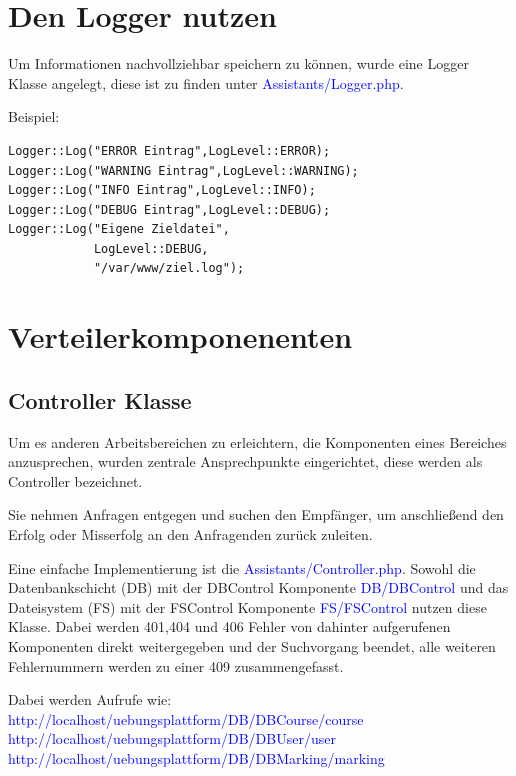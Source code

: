 \documentclass[10pt,a4paper,final,parskip]{scrartcl}
\newcommand{\blau}[1]{\textcolor{blue}{#1}}
\begin{document}
\section{Den Logger nutzen}
Um Informationen nachvollziehbar speichern zu können, wurde eine Logger Klasse angelegt, diese ist zu finden unter \blau{Assistants/Logger.php}.

\begin{minipage}{\textwidth}
Beispiel:
\begin{lstlisting}
Logger::Log("ERROR Eintrag",LogLevel::ERROR);
Logger::Log("WARNING Eintrag",LogLevel::WARNING);
Logger::Log("INFO Eintrag",LogLevel::INFO);
Logger::Log("DEBUG Eintrag",LogLevel::DEBUG);
Logger::Log("Eigene Zieldatei",
            LogLevel::DEBUG, 
            "/var/www/ziel.log");
\end{lstlisting}
\end{minipage}
 
\section{Verteilerkomponenenten}
\subsection{Controller Klasse}
Um es anderen Arbeitsbereichen zu erleichtern, die Komponenten eines Bereiches anzusprechen, wurden zentrale Ansprechpunkte eingerichtet, diese werden als Controller bezeichnet.

Sie nehmen Anfragen entgegen und suchen den Empfänger, um anschließend den Erfolg oder Misserfolg an den Anfragenden zurück zuleiten.

Eine einfache Implementierung ist die \blau{Assistants/Controller.php}. Sowohl die Datenbankschicht (DB) mit der DBControl Komponente \blau{DB/DBControl} und das Dateisystem (FS) mit der FSControl Komponente \blau{FS/FSControl} nutzen diese Klasse. Dabei werden 401,404 und 406 Fehler von dahinter aufgerufenen Komponenten direkt weitergegeben und der Suchvorgang beendet, alle weiteren Fehlernummern werden zu einer 409 zusammengefasst.

Dabei werden Aufrufe wie:\\
\blau{http://localhost/uebungsplattform/DB/DBCourse/course}\\
\blau{http://localhost/uebungsplattform/DB/DBUser/user}\\
\blau{http://localhost/uebungsplattform/DB/DBMarking/marking}\\
\end{document}
